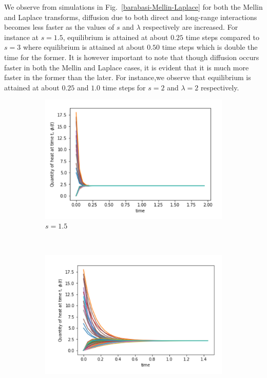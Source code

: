 \documentclass[10pt,a4paper]{article}
\theoremstyle{plain}
\theoremstyle{definition}
\begin{document}
       We observe from simulations in Fig.~\ref{barabasi-Mellin-Laplace} for both the Mellin and Laplace transforms, diffusion due to both direct and long-range interactions becomes less faster as the values of $s$ and $\lambda$ respectively are increased. For instance at $s=1.5$, equilibrium is attained at about $0.25$ time steps compared to $s=3$ where equilibrium is attained at about $0.50$ time steps which is double the time for the former. It is however important to note that though diffusion occurs faster in both the Mellin and Laplace cases, it is evident that it is much more faster in the former than the later. For instance,we observe that equilibrium is attained at about $0.25$ and $1.0$ time steps for $s=2$ and $\lambda=2$ respectively.
        \begin{figure}[H]
        	\centering
        	\begin{subfigure}[b]{0.45\textwidth}
        		\includegraphics[width=\textwidth]{images/Erdos-Mellin15.png}
        		\caption{$s=1.5$}
        	\end{subfigure}~
        	\begin{subfigure}[b]{0.45\textwidth}
        		\includegraphics[width= \textwidth]{images/Erdos-Laplace15.png}

\end{subfigure}
\end{figure}
\end{document}
